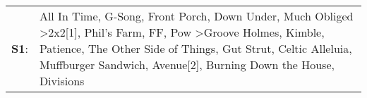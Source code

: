 \begin{supertabular}{p{0.03\textwidth}p{0.92\textwidth}}
 \textbf{S1}:  &  All In Time\textsuperscript{}, \enspace G-Song\textsuperscript{}, \enspace Front Porch\textsuperscript{}, \enspace Down Under\textsuperscript{}, \enspace Much Obliged\textsuperscript{} \textgreater \enspace 2x2[1]\textsuperscript{}, \enspace Phil's Farm\textsuperscript{}, \enspace FF\textsuperscript{}, \enspace Pow\textsuperscript{} \textgreater \enspace Groove Holmes\textsuperscript{}, \enspace Kimble\textsuperscript{}, \enspace Patience\textsuperscript{}, \enspace The Other Side of Things\textsuperscript{}, \enspace Gut Strut\textsuperscript{}, \enspace Celtic Alleluia\textsuperscript{}, \enspace Muffburger Sandwich\textsuperscript{}, \enspace Avenue[2]\textsuperscript{}, \enspace Burning Down the House\textsuperscript{}, \enspace Divisions\textsuperscript{}  \enspace  \\
\end{supertabular}

